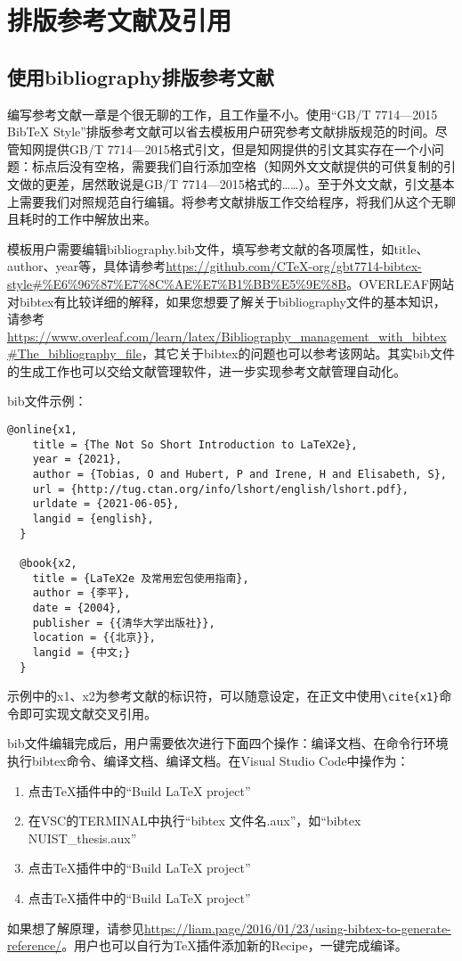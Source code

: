 \section{排版参考文献及引用}
\subsection{使用bibliography排版参考文献}
编写参考文献一章是个很无聊的工作，且工作量不小。使用“GB/T 7714—2015 BibTeX Style”排版参考文献可以省去模板用户研究参考文献排版规范的时间。尽管知网提供GB/T 7714—2015格式引文，但是知网提供的引文其实存在一个小问题：标点后没有空格，需要我们自行添加空格（知网外文文献提供的可供复制的引文做的更差，居然敢说是GB/T 7714—2015格式的……）。至于外文文献，引文基本上需要我们对照规范自行编辑。将参考文献排版工作交给程序，将我们从这个无聊且耗时的工作中解放出来。

模板用户需要编辑bibliography.bib文件，填写参考文献的各项属性，如title、author、year等，具体请参考\url{https://github.com/CTeX-org/gbt7714-bibtex-style#%E6%96%87%E7%8C%AE%E7%B1%BB%E5%9E%8B}。OVERLEAF网站对bibtex有比较详细的解释，如果您想要了解关于bibliography文件的基本知识，请参考\url{https://www.overleaf.com/learn/latex/Bibliography_management_with_bibtex#The_bibliography_file}，其它关于bibtex的问题也可以参考该网站。其实bib文件的生成工作也可以交给文献管理软件，进一步实现参考文献管理自动化。

bib文件示例：
{\color{green!50!black}
\begin{lstlisting}[breaklines=true,]
    @online{x1,
    title = {The Not So Short Introduction to LaTeX2e},
    year = {2021},
    author = {Tobias, O and Hubert, P and Irene, H and Elisabeth, S},
    url = {http://tug.ctan.org/info/lshort/english/lshort.pdf},
    urldate = {2021-06-05},
    langid = {english},
  }
  
  @book{x2,
    title = {LaTeX2e 及常用宏包使用指南},
    author = {李平},
    date = {2004},
    publisher = {{清华大学出版社}},
    location = {{北京}},
    langid = {中文;}
  }
\end{lstlisting}
}
示例中的x1、x2为参考文献的标识符，可以随意设定，在正文中使用\verb|\cite{x1}|命令即可实现文献交叉引用。

bib文件编辑完成后，用户需要依次进行下面四个操作：编译文档、在命令行环境执行bibtex命令、编译文档、编译文档。在Visual Studio Code中操作为：
\begin{enumerate}[1、]
    \item 点击\TeX 插件中的“Build LaTeX project”
    \item 在VSC的TERMINAL中执行“bibtex 文件名.aux”，如“bibtex NUIST\_thesis.aux”
    \item 点击\TeX 插件中的“Build LaTeX project”
    \item 点击\TeX 插件中的“Build LaTeX project”
\end{enumerate}
如果想了解原理，请参见\url{https://liam.page/2016/01/23/using-bibtex-to-generate-reference/}。用户也可以自行为\TeX 插件添加新的Recipe，一键完成编译。

